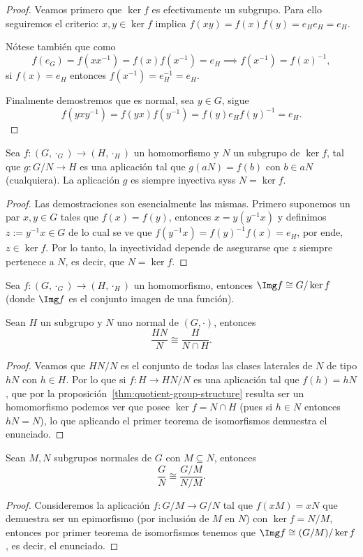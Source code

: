 \documentclass[11pt,oneside]{book}
\begin{document}
\begin{proof}
Veamos primero que $\ker f$ es efectivamente un subgrupo. Para ello seguiremos el criterio: $x,y\in\ker f$ implica $f(xy)=f(x)f(y)=e_He_H=e_H$.

Nótese también que como
$$f(e_G)=f(xx^{-1})=f(x)f(x^{-1})=e_H\implies f(x^{-1})=f(x)^{-1},$$
si $f(x)=e_H$ entonces $f(x^{-1})=e_H^{-1}=e_H$.

Finalmente demostremos que es normal, sea $y\in G$, sigue
$$f(yxy^{-1})=f(yx)f(y^{-1})=f(y)e_Hf(y)^{-1}=e_H.$$
\end{proof}
\begin{thm}
Sea $f:(G,\cdot_G)\rightarrow(H,\cdot_H)$ un homomorfismo y $N$ un subgrupo de $\ker f$, tal que $g:G/N\rightarrow H$ es una aplicación tal que $g(aN)=f(b)$ con $b\in aN$ (cualquiera). La aplicación $g$ es siempre inyectiva syss $N=\ker f$.
\end{thm}
\begin{proof}
Las demostraciones son esencialmente las mismas. Primero suponemos un par $x,y\in G$ tales que $f(x)=f(y)$, entonces $x=y(y^{-1}x)$ y definimos $z:=y^{-1}x\in G$ de lo cual se ve que $f(y^{-1}x)=f(y)^{-1}f(x)=e_H$, por ende, $z\in\ker f$. Por lo tanto, la inyectividad depende de asegurarse que $z$ siempre pertenece a $N$, es decir, que $N=\ker f$.
\end{proof}
\begin{thm}
Sea $f:(G,\cdot_G)\rightarrow(H,\cdot_H)$ un homomorfismo, entonces $\Img f\cong G/\ker f$ (donde $\Img f$ es el conjunto imagen de una función).
\end{thm}
\begin{thm}
Sean $H$ un subgrupo y $N$ uno normal de $(G,\cdot)$, entonces
$$\frac{HN}{N}\cong\frac{H}{N\cap H}.$$
\end{thm}
\begin{proof}
Veamos que $HN/N$ es el conjunto de todas las clases laterales de $N$ de tipo $hN$ con $h\in H$. Por lo que si $f:H\rightarrow HN/N$ es una aplicación tal que $f(h)=hN$, que por la proposición~\ref{thm:quotient-group-structure} resulta ser un homomorfismo podemos ver que posee $\ker f=N\cap H$ (pues si $h\in N$ entonces $hN=N$), lo que aplicando el primer teorema de isomorfismos demuestra el enunciado.
\end{proof}
\begin{thm}
Sean $M,N$ subgrupos normales de $G$ con $M\subseteq N$, entonces
$$\frac{G}{N}\cong\frac{G/M}{N/M}.$$
\end{thm}
\begin{proof}
Consideremos la aplicación $f:G/M\rightarrow G/N$ tal que $f(xM)=xN$ que demuestra ser un epimorfismo (por inclusión de $M$ en $N$) con $\ker f=N/M$, entonces por primer teorema de isomorfismos tenemos que $\Img f\cong(G/M)/\ker f$, es decir, el enunciado.
\end{proof}
\end{document}
